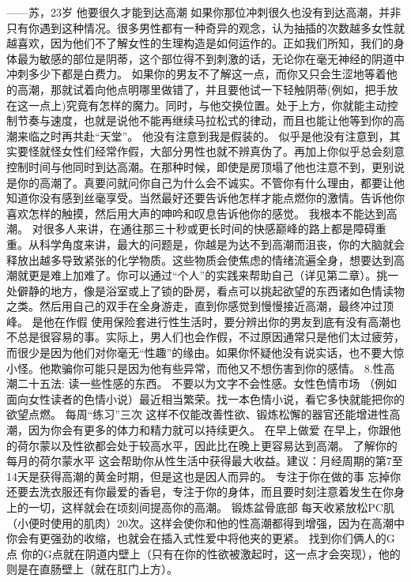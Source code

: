 \documentclass[12pt,UTF8]{ctexbook}
\begin{document}
——苏，23岁
他要很久才能到达高潮
如果你那位冲刺很久也没有到达高潮，并非只有你遇到这种情况。很多男性都有一种奇异的观念，认为抽插的次数越多女性就越喜欢，因为他们不了解女性的生理构造是如何运作的。正如我们所知，我们的身体最为敏感的部位是阴蒂，这个部位得不到刺激的话，无论你在毫无神经的阴道中冲刺多少下都是白费力。
如果你的男友不了解这一点，而你又只会生涩地等着他的高潮，那就试着向他点明哪里做错了，并且要他试一下轻触阴蒂(例如，把手放在这一点上)究竟有怎样的魔力。同时，与他交换位置。处于上方，你就能主动控制节奏与速度，也就是说他不能再继续马拉松式的律动，而且也能让他等到你的高潮来临之时再共赴“天堂”。
他没有注意到我是假装的。
似乎是他没有注意到，其实要怪就怪女性们经常作假，大部分男性也就不辨真伪了。再加上你似乎总会刻意控制时间与他同时到达高潮。在那种时候，即使是房顶塌了他也注意不到，更别说是你的高潮了。真要问就问你自己为什么会不诚实。不管你有什么理由，都要让他知道你没有感到丝毫享受。当然最好还要告诉他怎样才能点燃你的激情。告诉他你喜欢怎样的触摸，然后用大声的呻吟和叹息告诉他你的感觉。
我根本不能达到高潮。
对很多人来讲，在通往那三十秒或更长时间的快感巅峰的路上都是障碍重重。从科学角度来讲，最大的问题是，你越是为达不到高潮而沮丧，你的大脑就会释放出越多导致紧张的化学物质。这些物质会使焦虑的情绪流遍全身，想要达到高潮就更是难上加难了。你可以通过“个人”的实践来帮助自己（详见第二章）。挑一处僻静的地方，像是浴室或上了锁的卧房，看点可以挑起欲望的东西诸如色情读物之类。然后用自己的双手在全身游走，直到你感觉到慢慢接近高潮，最终冲过顶峰。
是他在作假
使用保险套进行性生活时，要分辨出你的男友到底有没有高潮也不总是很容易的事。实际上，男人们也会作假，不过原因通常只是他们太过疲劳，而很少是因为他们对你毫无“性趣”的缘由。如果你怀疑他没有说实话，也不要大惊小怪。他欺骗你可能只是因为他有些异常，而他又不想伤害到你的感情。
8.性高潮二十五法:
读一些性感的东西。
不要以为文字不会性感。女性色情市场 （例如面向女性读者的色情小说）最近相当繁荣。找一本色情小说，看它多快就能把你的欲望点燃。
每周“练习”三次
这样不仅能改善性欲、锻炼松懈的器官还能增进性高潮，因为你会有更多的体力和精力就可以持续更久。
在早上做爱
在早上，你跟他的荷尔蒙以及性欲都会处于较高水平，因此比在晚上更容易达到高潮。
了解你的每月的荷尔蒙水平
这会帮助你从性生活中获得最大收益。建议：月经周期的第7至14天是获得高潮的黄金时期，但是这也是因人而异的。
专注于你在做的事
忘掉你还要去洗衣服还有你最爱的香皂，专注于你的身体，而且要时刻注意着发生在你身上的一切，这样就会在顷刻间提高你的高潮。
锻炼盆骨底部
每天收紧放松PC肌（小便时使用的肌肉）20次。这样会使你和他的性高潮都得到增强，因为在高潮中你会有更强劲的收缩，也就会在插入式性爱中将他夹的更紧。
找到你们俩人的G点
你的G点就在阴道内壁上（只有在你的性欲被激起时，这一点才会突现），他的则是在直肠壁上（就在肛门上方）。
\end{document}
